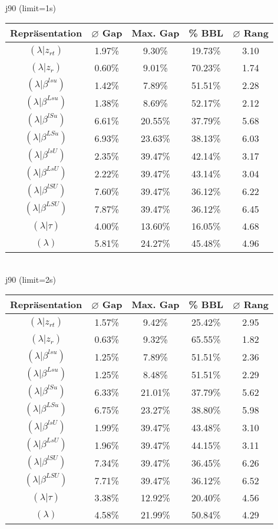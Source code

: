 \documentclass{scrartcl}
\begin{document}
\\[8pt]
\newpage
j90 (limit=1s)\\\begin{tabular}{ccccc}
\hline
Repräsentation & $\varnothing$ Gap & Max. Gap & \% BBL & $\varnothing$ Rang\\[3pt]
\hline
$(\lambda|z_{rt})$&1.97\%&9.30\%&19.73\%&3.10\\
\hline
$(\lambda|z_r)$&0.60\%&9.01\%&70.23\%&1.74\\
\hline
$(\lambda|\beta^{lsu})$&1.42\%&7.89\%&51.51\%&2.28\\
\hline
$(\lambda|\beta^{Lsu})$&1.38\%&8.69\%&52.17\%&2.12\\
\hline
$(\lambda|\beta^{lSu})$&6.61\%&20.55\%&37.79\%&5.68\\
\hline
$(\lambda|\beta^{LSu})$&6.93\%&23.63\%&38.13\%&6.03\\
\hline
$(\lambda|\beta^{lsU})$&2.35\%&39.47\%&42.14\%&3.17\\
\hline
$(\lambda|\beta^{LsU})$&2.22\%&39.47\%&43.14\%&3.04\\
\hline
$(\lambda|\beta^{lSU})$&7.60\%&39.47\%&36.12\%&6.22\\
\hline
$(\lambda|\beta^{LSU})$&7.87\%&39.47\%&36.12\%&6.45\\
\hline
$(\lambda|\tau)$&4.00\%&13.60\%&16.05\%&4.68\\
\hline
$(\lambda)$&5.81\%&24.27\%&45.48\%&4.96\\\hline
\end{tabular}
\\[8pt]j90 (limit=2s)\\\begin{tabular}{ccccc}
\hline
Repräsentation & $\varnothing$ Gap & Max. Gap & \% BBL & $\varnothing$ Rang\\[3pt]
\hline
$(\lambda|z_{rt})$&1.57\%&9.42\%&25.42\%&2.95\\
\hline
$(\lambda|z_r)$&0.63\%&9.32\%&65.55\%&1.82\\
\hline
$(\lambda|\beta^{lsu})$&1.25\%&7.89\%&51.51\%&2.36\\
\hline
$(\lambda|\beta^{Lsu})$&1.25\%&8.48\%&51.51\%&2.29\\
\hline
$(\lambda|\beta^{lSu})$&6.33\%&21.01\%&37.79\%&5.62\\
\hline
$(\lambda|\beta^{LSu})$&6.75\%&23.27\%&38.80\%&5.98\\
\hline
$(\lambda|\beta^{lsU})$&1.99\%&39.47\%&43.48\%&3.10\\
\hline
$(\lambda|\beta^{LsU})$&1.96\%&39.47\%&44.15\%&3.11\\
\hline
$(\lambda|\beta^{lSU})$&7.34\%&39.47\%&36.45\%&6.26\\
\hline
$(\lambda|\beta^{LSU})$&7.71\%&39.47\%&36.12\%&6.52\\
\hline
$(\lambda|\tau)$&3.38\%&12.92\%&20.40\%&4.56\\
\hline
$(\lambda)$&4.58\%&21.99\%&50.84\%&4.29\\\hline
\end{tabular}
\end{document}
